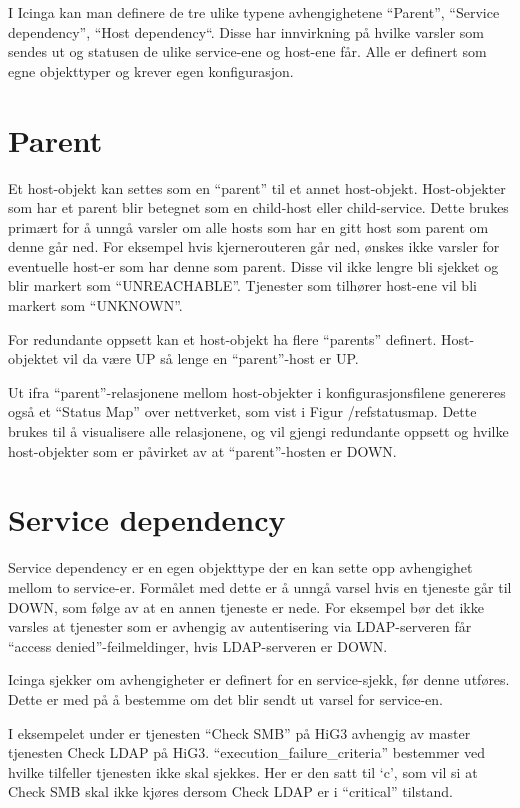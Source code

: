 I Icinga kan man definere de tre ulike typene avhengighetene “Parent”, “Service dependency”, “Host dependency“. Disse har innvirkning på hvilke varsler som sendes ut og statusen de ulike service-ene og host-ene får. Alle er definert som egne objekttyper og krever egen konfigurasjon. 

\section{Parent}
Et host-objekt kan settes som en “parent” til et annet host-objekt. Host-objekter som har et parent blir betegnet som en child-host eller child-service. Dette brukes primært for å unngå varsler om alle hosts som har en gitt host som parent om denne går ned. For eksempel hvis kjernerouteren går ned, ønskes ikke varsler for eventuelle host-er som har denne som parent. Disse vil ikke lengre bli sjekket og blir markert som “UNREACHABLE”. Tjenester som tilhører host-ene vil bli markert som “UNKNOWN”.

For redundante oppsett kan et host-objekt ha flere “parents” definert. Host-objektet vil da være UP så lenge en “parent”-host er UP.

Ut ifra “parent”-relasjonene mellom host-objekter i konfigurasjonsfilene genereres også et “Status Map” over nettverket, som vist i Figur /ref{statusmap}. Dette brukes til å visualisere alle relasjonene, og vil gjengi redundante oppsett og hvilke host-objekter som er påvirket av at “parent”-hosten er DOWN.

\section{Service dependency}

Service dependency er en egen objekttype der en kan sette opp avhengighet mellom to service-er. Formålet med dette er å unngå varsel hvis en tjeneste går til DOWN, som følge av at en annen tjeneste er nede. For eksempel bør det ikke varsles at tjenester som er avhengig av autentisering via LDAP-serveren får “access denied”-feilmeldinger, hvis LDAP-serveren er DOWN. 

Icinga sjekker om avhengigheter er definert for en service-sjekk, før denne utføres. Dette er med på å bestemme om det blir sendt ut varsel for service-en.

I eksempelet under er tjenesten “Check SMB” på HiG3 avhengig av master tjenesten Check LDAP på HiG3. “execution\_failure\_criteria” bestemmer ved hvilke tilfeller tjenesten ikke skal sjekkes. Her er den satt til ‘c’, som vil si at Check SMB skal ikke kjøres dersom Check LDAP er i “critical” tilstand.

